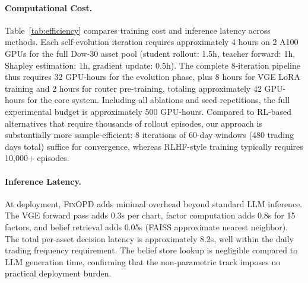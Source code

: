 \paragraph{Computational Cost.} Table~\ref{tab:efficiency} compares training cost and inference latency across methods. Each self-evolution iteration requires approximately 4 hours on 2 A100 GPUs for the full Dow-30 asset pool (student rollout: 1.5h, teacher forward: 1h, Shapley estimation: 1h, gradient update: 0.5h). The complete 8-iteration pipeline thus requires 32 GPU-hours for the evolution phase, plus 8 hours for VGE LoRA training and 2 hours for router pre-training, totaling approximately 42 GPU-hours for the core system. Including all ablations and seed repetitions, the full experimental budget is approximately 500 GPU-hours. Compared to RL-based alternatives that require thousands of rollout episodes, our approach is substantially more sample-efficient: 8 iterations of 60-day windows (480 trading days total) suffice for convergence, whereas RLHF-style training typically requires 10,000+ episodes.

\paragraph{Inference Latency.} At deployment, \textsc{FinOPD} adds minimal overhead beyond standard LLM inference. The VGE forward pass adds 0.3s per chart, factor computation adds 0.8s for 15 factors, and belief retrieval adds 0.05s (FAISS approximate nearest neighbor). The total per-asset decision latency is approximately 8.2s, well within the daily trading frequency requirement. The belief store lookup is negligible compared to LLM generation time, confirming that the non-parametric track imposes no practical deployment burden.
